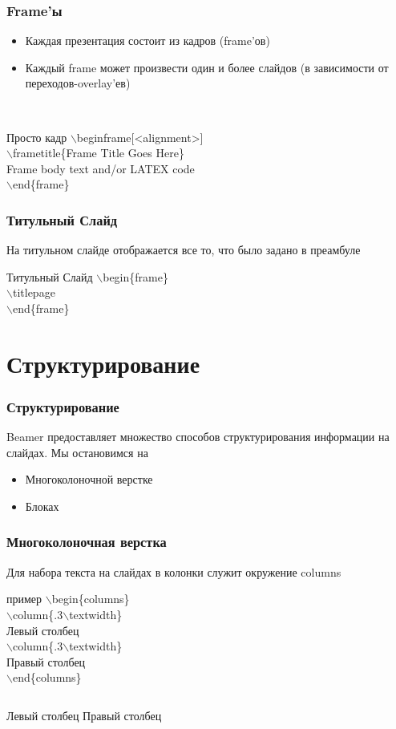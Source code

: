 \documentclass[ignorenonframetext]{beamer}
\begin{document}
\begin{frame}
\frametitle{Frame’ы}
\begin{itemize}
\item Каждая презентация состоит из кадров (frame’ов)
\item Каждый frame может произвести один и более слайдов (в
зависимости от переходов-overlay’ев)
\end{itemize}
\\
\begin{block}{Просто кадр}
$\backslash$begin{frame}[<alignment>]\\
$\backslash$frametitle\{Frame Title Goes Here\}\\
Frame body text and/or LATEX code\\
$\backslash$end\{frame\}
\end{block}
\end{frame}

\begin{frame}
\frametitle{Титульный Слайд}
На титульном слайде отображается все то, что было задано в
преамбуле\\


\begin{block}{Титульный Слайд}
$\backslash$begin\{frame\}\\
$\backslash$titlepage\\
$\backslash$end\{frame\}\\
\end{block}
\end{frame}


\section{Структурирование}
\begin{frame}
\frametitle{Структурирование}
Beamer предоставляет множество способов структурирования
информации на слайдах. Мы остановимся на
\begin{itemize}
\item  Многоколоночной верстке
\item  Блоках
\end{itemize}
\end{frame}

\begin{frame}
\frametitle{Многоколоночная верстка}
Для набора текста на слайдах в колонки служит окружение
columns\\
\begin{block}{пример}
$\backslash$begin\{columns\}\\
$\backslash$column\{.3$\backslash$textwidth\}\\
Левый столбец\\
$\backslash$column\{.3$\backslash$textwidth\}\\
Правый столбец\\
$\backslash$end\{columns\}\\

\begin{columns}
Левый столбец
Правый столбец
\end{columns}
\end{block}
\end{frame}
\end{document}
